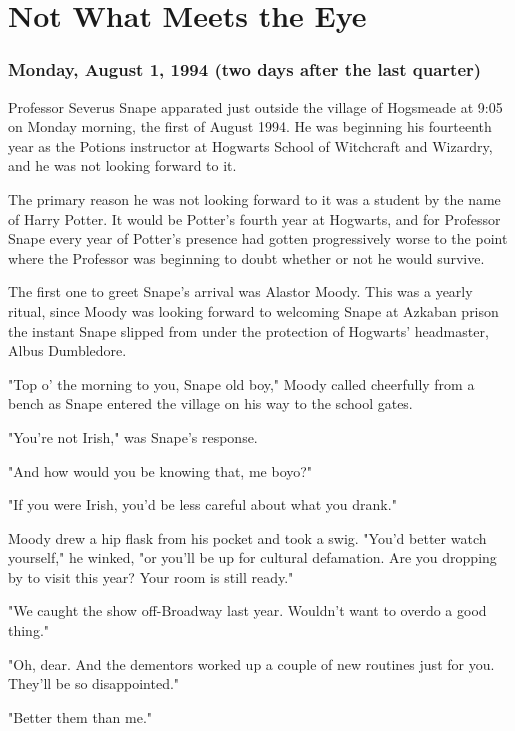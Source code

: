 
\chapter{Not What Meets the Eye}

\subsection{Monday, August 1, 1994 (two days after the last quarter)}

Professor Severus Snape apparated just outside the village of Hogsmeade at 9:05 on Monday morning, the first of August 1994. He was beginning his fourteenth year as the Potions instructor at Hogwarts School of Witchcraft and Wizardry, and he was not looking forward to it.

The primary reason he was not looking forward to it was a student by the name of Harry Potter. It would be Potter's fourth year at Hogwarts, and for Professor Snape every year of Potter's presence had gotten progressively worse to the point where the Professor was beginning to doubt whether or not he would survive.

The first one to greet Snape's arrival was Alastor Moody. This was a yearly ritual, since Moody was looking forward to welcoming Snape at Azkaban prison the instant Snape slipped from under the protection of Hogwarts' headmaster, Albus Dumbledore.

"Top o' the morning to you, Snape old boy," Moody called cheerfully from a bench as Snape entered the village on his way to the school gates.

"You're not Irish," was Snape's response.

"And how would you be knowing that, me boyo?"

"If you were Irish, you'd be less careful about what you drank."

Moody drew a hip flask from his pocket and took a swig. "You'd better watch yourself," he winked, "or you'll be up for cultural defamation. Are you dropping by to visit this year? Your room is still ready."

"We caught the show off-Broadway last year. Wouldn't want to overdo a good thing."

"Oh, dear. And the dementors worked up a couple of new routines just for you. They'll be so disappointed."

"Better them than me."

